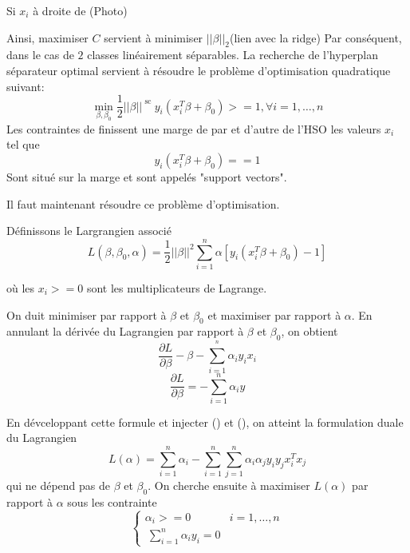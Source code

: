 \documentclass{article}
\begin{document}
Si $x_i$ \`a droite de 
(Photo)

Ainsi, maximiser $C$ servient \`a minimiser $||\beta||_2$(lien avec la ridge)
Par cons\'equent, dans le cas de $2$ classes lin\'eairement s\'eparables. La recherche de l'hyperplan s\'eparateur optimal servient \`a r\'esoudre le probl\`eme d'optimisation quadratique suivant: 
\begin{equation}
\min_{\beta,\beta_0}\frac{1}{2}||\beta||^ \text{ sc } y_i(x_i^T\beta+\beta_0)>=1, \forall i=1,\ldots,n
\end{equation}
Les contraintes d\;e finissent une marge de par et d'autre de l'HSO les valeurs $x_i$ tel que 
\begin{equation}
y_i(x_i^T\beta+\beta_0)==1
\end{equation}
Sont situ\'e sur la marge et sont appel\'es "support vectors".

Il faut maintenant r\'esoudre ce probl\`eme d'optimisation. 

D\'efinissons le Largrangien associ\'e 
\begin{equation}
L(\beta,\beta_0,\alpha)=\frac{1}{2}||\beta||^2\sum_{i=1}^n \alpha[y_i(x_i^T\beta+\beta_0)-1]
\end{equation}

o\`u les $x_i>=0$ sont les multiplicateurs de Lagrange.

On duit minimiser par rapport \`a  $\beta$ et $\beta_0$ et maximiser par rapport \`a $\alpha$. En annulant la d\'eriv\'ee du Lagrangien par rapport \`a $\beta$ et $\beta_0$, on obtient
\begin{equation}
\frac{\partial L}{\partial \beta}-\beta-\sum_{i=1}^^n\alpha_i y_ix_i
\end{equation}
\begin{equation}
\frac{\partial L}{\partial \beta}=-\sum_{i=1}^n\alpha_i y
\end{equation}

En d\'evceloppant cette formule et injecter () et (), on atteint la formulation duale du  Lagrangien 
\begin{equation}
L(\alpha)=\sum_{i=1}^n\alpha_i-\sum_{i=1}^n\sum_{j=1}^n\alpha_i\alpha_jy_iy_jx_i^Tx_j
\end{equation}
qui ne d\'epend pas de $\beta$ et $\beta_0$. On cherche ensuite \`a maximiser $L(\alpha)$ par rapport \`a $\alpha$ sous les contrainte
\begin{equation}
\left\{\begin{array}{ll}
\alpha_i>=0 &  i=1,\ldots,n\\\
\sum_{i=1}^n\alpha_iy_i=0
\end{array}\right.
\end{equation}
\end{document}
